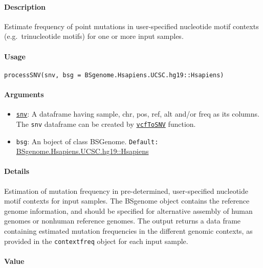\documentclass[]{article}
\providecommand{\tightlist}{%
  \setlength{\itemsep}{0pt}\setlength{\parskip}{0pt}}
\let\oldparagraph\paragraph
\renewcommand{\paragraph}[1]{\oldparagraph{#1}\mbox{}}
\begin{document}
\paragraph{\texorpdfstring{\textbf{Description}}{Description}}\label{description-2}

Estimate frequency of point mutations in user-specified nucleotide motif
contexts (e.g.~trinucleotide motifs) for one or more input samples.

\paragraph{\texorpdfstring{\textbf{Usage}}{Usage}}\label{usage-2}

\texttt{processSNV(snv,\ bsg\ =\ BSgenome.Hsapiens.UCSC.hg19::Hsapiens)}

\paragraph{\texorpdfstring{\textbf{Arguments
}}{Arguments }}\label{arguments-2}

\begin{itemize}
\tightlist
\item
  \protect\hyperlink{snv}{\texttt{snv}}: A dataframe having sample, chr,
  pos, ref, alt and/or freq as its columns. The \texttt{snv} dataframe
  can be created by \protect\hyperlink{vcfToSNV}{\texttt{vcfToSNV}}
  function.
\item
  \texttt{bsg}: An boject of class BSGenome. \texttt{Default:}
  \href{https://bioconductor.org/packages/release/data/annotation/html/BSgenome.Hsapiens.UCSC.hg19.html}{BSgenome.Hsapiens.UCSC.hg19::Hsapiens}
\end{itemize}

\paragraph{\texorpdfstring{\textbf{Details}}{Details}}\label{details-2}

Estimation of mutation frequency in pre-determined, user-specified
nucleotide motif contexts for input samples. The BSgenome object
contains the reference genome information, and should be specified for
alternative assembly of human genomes or nonhuman reference genomes. The
output returns a data frame containing estimated mutation frequencies in
the different genomic contexts, as provided in the \texttt{contextfreq}
object for each input sample.

\hypertarget{contextfreq}{\paragraph{\texorpdfstring{\textbf{Value}}{Value}}\label{contextfreq}}
\end{document}
